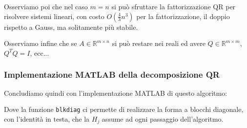 \documentclass[a4paper,11pt]{article}
\begin{document}
Osserviamo poi che nel caso $m = n$ si può sfruttare la fattorizzazione QR per risolvere sistemi lineari, con costo $O(\frac{4}{3}n^3)$ per la fattorizzazione, il doppio rispetto a Gauss, ma solitamente più stabile.

Osserviamo infine che se $A \in \mathbb{R}^{m \times n}$ si può restare nei reali ed avere $Q \in \mathbb{R}^{m \times m}$, $Q^T Q = I$, ecc...

\subsubsection{Implementazione MATLAB della decomposizione QR}
Concludiamo quindi con l'implementazione MATLAB di questo algoritmo:

Dove la funzione \lstinline|blkdiag| ci permette di realizzare la forma a blocchi diagonale, con l'identità in testa, che la $H_j$ assume ad ogni passaggio dell'algoritmo.
\end{document}
